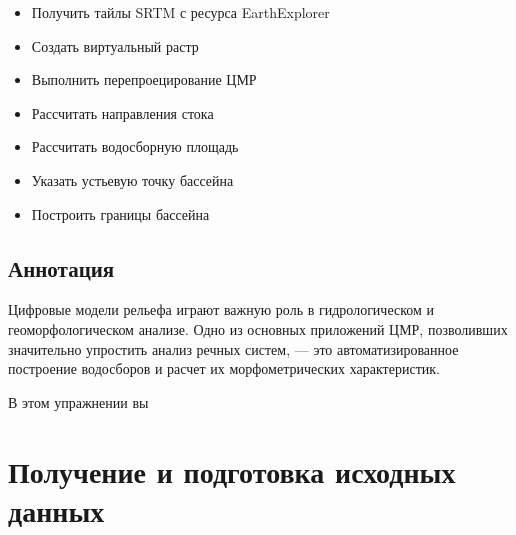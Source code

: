\documentclass[
  12pt,
]{book}
\begin{document}
\begin{itemize}
\item
  Получить тайлы SRTM с ресурса EarthExplorer
\item
  Создать виртуальный растр
\item
  Выполнить перепроецирование ЦМР
\item
  Рассчитать направления стока
\item
  Рассчитать водосборную площадь
\item
  Указать устьевую точку бассейна
\item
  Построить границы бассейна
\end{itemize}

\hypertarget{hydrodem-annotation}{%
\subsection{Аннотация}\label{hydrodem-annotation}}

Цифровые модели рельефа играют важную роль в гидрологическом и геоморфологическом анализе. Одно из основных приложений ЦМР, позволивших значительно упростить анализ речных систем, --- это автоматизированное построение водосборов и расчет их морфометрических характеристик.

В этом упражнении вы

\hypertarget{hydrodem-init}{%
\section{Получение и подготовка исходных данных}\label{hydrodem-init}}
\end{document}

